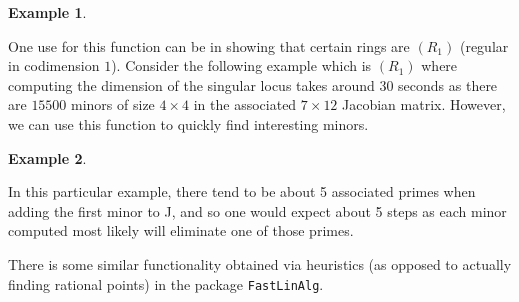 \documentclass[11pt]{amsart}
\theoremstyle{definition}
\newtheorem{example}{Example}[section]
\begin{document}
\begin{example}
	
\end{example}

One use for this function can be in showing that certain rings are $(R_1)$ (regular in codimension $1$).
Consider the following example which is $(R_1)$ where computing the dimension of the singular locus takes around $30$ seconds as there are $15500$ minors of size $4 \times 4$ in the associated $7 \times 12$ Jacobian matrix.  However, we can use this function to quickly find interesting minors.
\begin{example}
	
	\end{example} 

In this particular example, there tend to be about 5 associated primes when adding the first minor to J, and so one would expect about 5 steps as each minor computed most likely will eliminate one of those primes.

There is some similar functionality obtained via heuristics (as opposed to actually finding rational points) in the package {\tt FastLinAlg}.


\vspace{2em}
\end{document}
